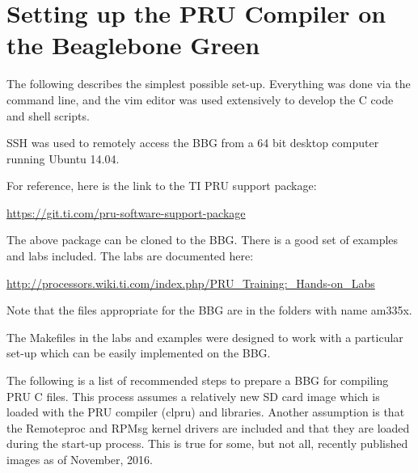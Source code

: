 %
%
%

\chapter{Setting up the PRU Compiler on the Beaglebone Green}

The following describes the simplest possible set-up.  Everything was done via the command line, and the vim editor was used extensively to develop the C code and shell scripts.

SSH was used to remotely access the BBG from a 64 bit desktop computer running Ubuntu 14.04.

For reference, here is the link to the TI PRU support package:

\url{https://git.ti.com/pru-software-support-package}

The above package can be cloned to the BBG.  There is a good set of examples and labs included.  The labs are documented here:

\url{http://processors.wiki.ti.com/index.php/PRU_Training:_Hands-on_Labs}

Note that the files appropriate for the BBG are in the folders with name am335x.

The Makefiles in the labs and examples were designed to work with a particular set-up which can be easily implemented on the BBG.

The following is a list of recommended steps to prepare a BBG for compiling PRU C files.
This process assumes a relatively new SD card image which is loaded with the PRU compiler (clpru) and libraries.  Another assumption is that the Remoteproc and RPMsg kernel drivers are included and that they are loaded during the start-up process.  This is true for some, but not all, recently published images as of November, 2016. 

